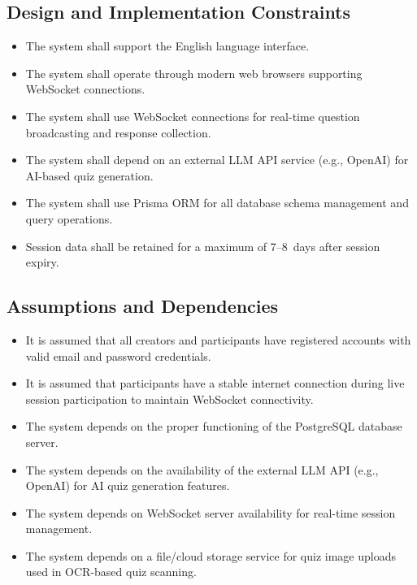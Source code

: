 \documentclass[12pt,a4paper]{article}
\begin{document}
\subsection{Design and Implementation Constraints}
\begin{itemize}
  \item The system shall support the English language interface.
  \item The system shall operate through modern web browsers supporting WebSocket
        connections.
  \item The system shall use WebSocket connections for real-time question
        broadcasting and response collection.
  \item The system shall depend on an external LLM API service (e.g., OpenAI) for
        AI-based quiz generation.
  \item The system shall use Prisma ORM for all database schema management and
        query operations.
  \item Session data shall be retained for a maximum of 7--8~days after session
        expiry.
\end{itemize}

\subsection{Assumptions and Dependencies}
\begin{itemize}
  \item It is assumed that all creators and participants have registered accounts
        with valid email and password credentials.
  \item It is assumed that participants have a stable internet connection during live
        session participation to maintain WebSocket connectivity.
  \item The system depends on the proper functioning of the PostgreSQL database
        server.
  \item The system depends on the availability of the external LLM API (e.g.,
        OpenAI) for AI quiz generation features.
  \item The system depends on WebSocket server availability for real-time session
        management.
  \item The system depends on a file/cloud storage service for quiz image uploads
        used in OCR-based quiz scanning.
\end{itemize}

\end{document}
